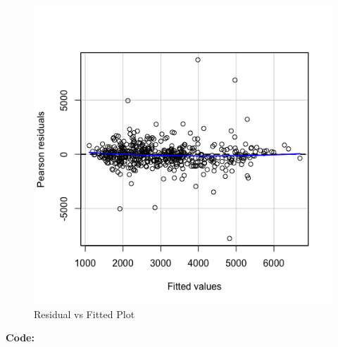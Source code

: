 \documentclass[12pt]{article}
\makeatletter
\theoremstyle{homework}
\newenvironment{exercise}[1]
{\def\@currentlabel{#1}\exercisecore}
{\endexercisecore}
\makeatother
\begin{document}
\begin{exercise}{2}
\begin{enumerate}
    \begin{figure}[H] 
      \begin{center} 
      \caption{Residual vs Fitted Plot} 
      \includegraphics[width = \textwidth]{Rplot04.png} 
    \end{center} 
  \end{figure}
  \textbf{Code:}
  \begin{center}
    
    \end{center} 


  \end{enumerate}

\end{exercise}
\newpage
\end{document}
